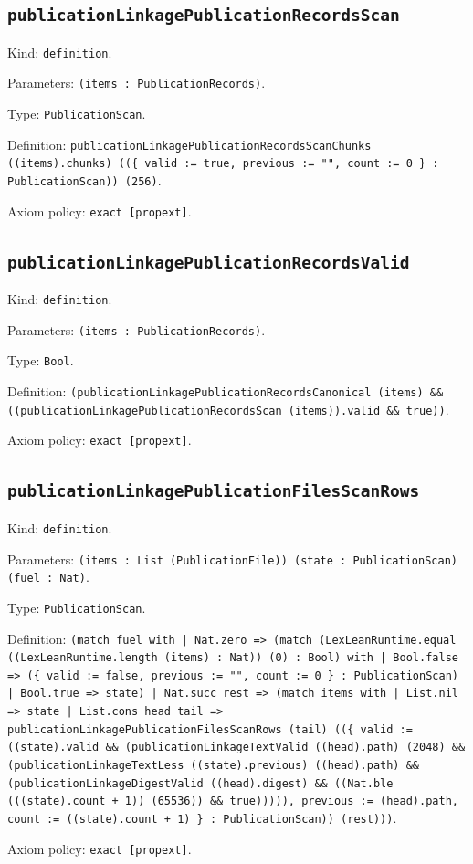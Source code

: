 \documentclass[11pt]{article}
\begin{document}
\subsection*{\texttt{publicationLinkagePublicationRecordsScan}}
\noindent Kind: \texttt{definition}.\par
\noindent Parameters: \texttt{(items : PublicationRecords)}.\par
\noindent Type: \texttt{PublicationScan}.\par
\noindent Definition: \texttt{publicationLinkagePublicationRecordsScanChunks ((items).chunks) ((\{ valid := true, previous := "", count := 0 \} : PublicationScan)) (256)}.\par
\noindent Axiom policy: \texttt{exact [propext]}.\par
\subsection*{\texttt{publicationLinkagePublicationRecordsValid}}
\noindent Kind: \texttt{definition}.\par
\noindent Parameters: \texttt{(items : PublicationRecords)}.\par
\noindent Type: \texttt{Bool}.\par
\noindent Definition: \texttt{(publicationLinkagePublicationRecordsCanonical (items) \&\& ((publicationLinkagePublicationRecordsScan (items)).valid \&\& true))}.\par
\noindent Axiom policy: \texttt{exact [propext]}.\par
\subsection*{\texttt{publicationLinkagePublicationFilesScanRows}}
\noindent Kind: \texttt{definition}.\par
\noindent Parameters: \texttt{(items : List (PublicationFile)) (state : PublicationScan) (fuel : Nat)}.\par
\noindent Type: \texttt{PublicationScan}.\par
\noindent Definition: \texttt{(match fuel with | Nat.zero => (match (LexLeanRuntime.equal ((LexLeanRuntime.length (items) : Nat)) (0) : Bool) with | Bool.false => (\{ valid := false, previous := "", count := 0 \} : PublicationScan) | Bool.true => state) | Nat.succ rest => (match items with | List.nil => state | List.cons head tail => publicationLinkagePublicationFilesScanRows (tail) ((\{ valid := ((state).valid \&\& (publicationLinkageTextValid ((head).path) (2048) \&\& (publicationLinkageTextLess ((state).previous) ((head).path) \&\& (publicationLinkageDigestValid ((head).digest) \&\& ((Nat.ble (((state).count + 1)) (65536)) \&\& true))))), previous := (head).path, count := ((state).count + 1) \} : PublicationScan)) (rest)))}.\par
\noindent Axiom policy: \texttt{exact [propext]}.\par
\end{document}
